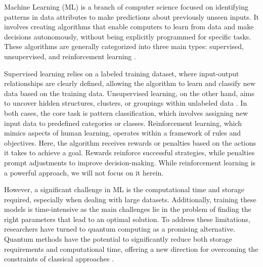 \documentclass{article}
\begin{document}
Machine Learning (ML) is a branch of computer science focused on identifying patterns in data attributes to make predictions about previously unseen inputs. It involves creating algorithms that enable computers to learn from data and make decisions autonomously, without being explicitly programmed for specific tasks. These algorithms are generally categorized into three main types: supervised, unsupervised, and reinforcement learning \cite{Ayodele10}.

Supervised learning relies on a labeled training dataset, where input-output relationships are clearly defined, allowing the algorithm to learn and classify new data based on the training data. Unsupervised learning, on the other hand, aims to uncover hidden structures, clusters, or groupings within unlabeled data \cite{10047618}. In both cases, the core task is pattern classification, which involves assigning new input data to predefined categories or classes. Reinforcement learning, which mimics aspects of human learning, operates within a framework of rules and objectives. Here, the algorithm receives rewards or penalties based on the actions it takes to achieve a goal. Rewards reinforce successful strategies, while penalties prompt adjustments to improve decision-making. While reinforcement learning is a powerful approach, we will not focus on it herein.

However, a significant challenge in ML is the computational time and storage required, especially when dealing with large datasets. Additionally, training these models is time-intensive as the main challenges lie in the problem of finding the right parameters that lead to an optimal solution. To address these limitations, researchers have turned to quantum computing as a promising alternative. Quantum methods have the potential to significantly reduce both storage requirements and computational time, offering a new direction for overcoming the constraints of classical approaches \cite{degruyterIntroductionQuantum}.
\end{document}
